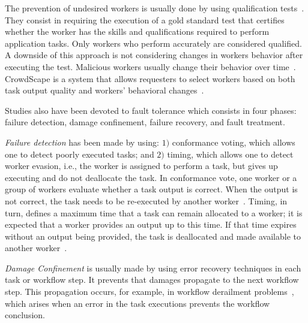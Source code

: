 \documentclass[11pt]{bmc_article_s50}
\begin{document}
The prevention of undesired workers is usually done by using qualification tests~\cite{Chen:chiHcomp:2011}. They consist in requiring the execution of a gold standard test that certifies whether the worker has the skills and qualifications required to perform application tasks. Only workers who perform accurately are considered qualified. A downside of this approach is not considering changes in workers behavior after executing the test. Malicious workers usually change their behavior over time~\cite{Vuurens-CIR2011}. CrowdScape is a system that allows requesters to select workers based on both task output quality and workers' behavioral changes~\cite{Rzeszotarski:UIST:2012}.

Studies also have been devoted to fault tolerance which consists in four phases: failure detection, damage confinement, failure recovery, and fault treatment.

\textit{Failure detection} has been made by using: $1)$ conformance voting, which allows one to detect poorly executed tasks; and $2)$ timing, which allows one to detect worker evasion, i.e., the worker is assigned to perform a task, but gives up executing and do not deallocate the task. In conformance vote, one worker or a group of workers evaluate whether a task output is correct. When the output is not correct, the task needs to be re-executed by another worker~\cite{Kulkarni2012}. Timing, in turn, defines a maximum time that a task can remain allocated to a worker; it is expected that a worker provides an output up to this time. If that time expires without an output being provided, the task is deallocated and made available to another worker~\cite{Bernstein:2010}.

\textit{Damage Confinement} is usually made by using error recovery techniques in each task or workflow step. It prevents that damages propagate to the next workflow step. This propagation occurs, for example, in workflow derailment problems~\cite{Kulkarni2011b}, which arises when an error in the task executions prevents the workflow conclusion.
\end{document}
